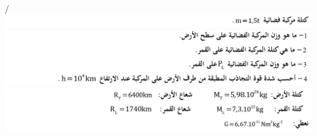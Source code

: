 \documentclass[12pt,a4paper]{article}
\begin{document}
\begin{exercice}{}/
					\includegraphics[width=\linewidth]{images/Tc/p1/e16_1.png}
					\includegraphics[width=\linewidth]{images/Tc/p1/e16_2.png}
					\includegraphics[width=\linewidth]{images/Tc/p1/e16_3.png}
					\end{exercice}%
  
\end{document}
